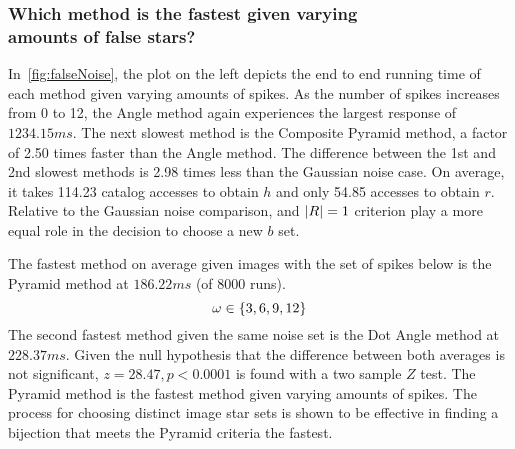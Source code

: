 \subsubsection{Which method is the fastest given varying \\ amounts of false stars?}
In~\autoref{fig:falseNoise}, the plot on the left depicts the end to end running time of each method given varying
amounts of spikes.
As the number of spikes increases from 0 to 12, the Angle method again experiences the largest response of
$1234.15\si{ms}$.
The next slowest method is the Composite Pyramid method, a factor of 2.50 times faster than the Angle method.
The difference between the 1st and 2nd slowest methods is 2.98 times less than the Gaussian noise case.
On average, it takes 114.23 catalog accesses to obtain $h$ and only 54.85 accesses to obtain $r$.
Relative to the Gaussian noise comparison,  and $\left| R \right| = 1$ criterion play a more equal role in
the decision to choose a new $b$ set.

%
%
%
%
The fastest method on average given images with the set of spikes below is the Pyramid method at $186.22\si{ms}$
(of 8000 runs).
\begin{equation}\label{eq:numberOfSpikes}
    \omega \in \set{ 3, 6, 9, 12 }
\end{equation}
The second fastest method given the same noise set is the Dot Angle method at $228.37\si{ms}$.
Given the null hypothesis that the difference between both averages is not significant, $z = 28.47, p < 0.0001$ is
found with a two sample $Z$ test.
The Pyramid method is the fastest method given varying amounts of spikes.
The process for choosing distinct image star sets is shown to be effective in finding a bijection that meets the Pyramid
criteria the fastest.

